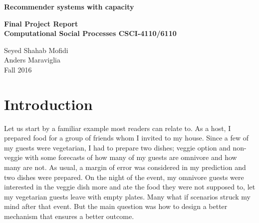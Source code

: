\documentclass[11pt, letterpaper]{article}
\begin{document}
\setlength\intextsep{0pt}

\begin{center}
	\huge
	{\bf Recommender systems with capacity } 
\end{center}

\begin{center}
	\large
	{\bf Final Project Report \\				
		Computational Social Processes CSCI-4110/6110 }
\end{center}	 

\begin{center}
	\large	 
	Seyed Shahab Mofidi\\
	Anders Maraviglia\\
	Fall 2016
\end{center}


\section{Introduction}
Let us start by a familiar example most readers can relate to. As a host, I prepared food for a group of friends whom I invited to my house. Since a few of my guests were vegetarian, I had to prepare two dishes; veggie option and non-veggie with some forecasts of how many of my guests are omnivore and how many are not. As usual, a margin of error was considered in my prediction and two dishes were prepared. On the night of the event, my omnivore guests were interested in the veggie dish more and ate the food they were not supposed to, let my vegetarian guests leave with empty plates. Many what if scenarios struck my mind after that event. But the main question was how to design a better mechanism that ensures a better outcome.
\end{document}
